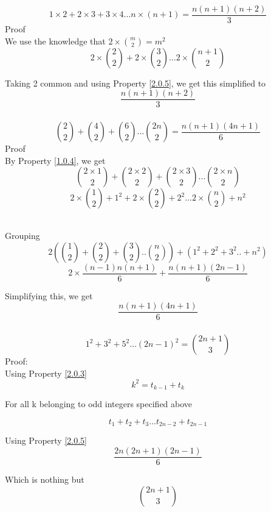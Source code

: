 \documentclass{article}
\begin{document}
\subsubsection{}\label{2.0.6}
\[1\times2 + 2\times3 + 3\times4 . . . n\times(n+1) = \frac{n(n+1)(n+2)}{3}\]
Proof\\


We use the knowledge that \(2\times \binom{m}{2} = m^2 \)
\[2\times\binom{2}{2} + 2\times\binom{3}{2} . . . 2\times\binom{n+1}{2}\]

Taking 2 common and using Property \ref{2.0.5}, we get this simplified to 
\[\frac{n(n+1)(n+2)}{3}\]

\subsubsection{}\label{2.0.7}
\[\binom{2}{2} + \binom{4}{2} + \binom{6}{2} . . . \binom{2n}{2} = \frac{n(n+1)(4n+1)}{6}\]
Proof\\

By Property \ref{1.0.4}, we get
\[\binom{2\times1}{2} + \binom{2\times2}{2} + \binom{2\times3}{2} . . . \binom{2\times n}{2}\]
\[2\times\binom{1}{2} + 1^2 + 2\times\binom{2}{2} + 2^2 . . . 2\times\binom{n}{2} +n^2\]\

Grouping
\[2( \binom{1}{2} + \binom{2}{2} + \binom{3}{2} . . \binom{n}{2} ) + ( 1^2 + 2^2 + 3^2 . .  + n^2 ) \]
\[2\times\frac{(n-1)n(n+1)}{6} + \frac{n(n+1)(2n-1)}{6}\]

Simplifying this, we get
\[\frac{n(n+1)(4n+1)}{6}\]

\subsubsection{}\label{2.0.8}
\[1^2 + 3^2 + 5^2 . . . (2n-1)^2 = \binom{2n+1}{3}\]
Proof: \\

Using Property \ref{2.0.3}
\[ k^2 = t_{k-1} + t_k\]

For all k belonging to odd integers specified above

\[t_1 + t_2 + t_3 . . . t_{2n-2} + t_{2n-1}\]

Using Property \ref{2.0.5}
\[\frac{2n(2n+1)(2n-1)}{6}\]

Which is nothing but
\[\binom{2n+1}{3}\]
\end{document}
